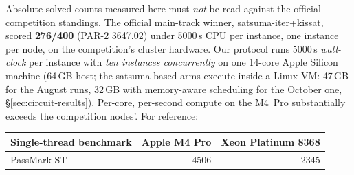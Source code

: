 \documentclass[10pt]{article}
\begin{document}
Absolute solved counts measured here must \emph{not} be read against
the official competition standings. The official main-track winner,
satsuma-iter+kissat, scored \textbf{276/400} (PAR-2 3647.02) under
5000\,s CPU per instance, one instance per node, on the competition's
cluster hardware. Our protocol runs 5000\,s \emph{wall-clock} per
instance with \emph{ten instances concurrently} on one 14-core Apple
Silicon machine (64\,GB host; the satsuma-based arms execute inside a
Linux VM: 47\,GB for the August runs, 32\,GB with memory-aware
scheduling for the October one, \S\ref{sec:circuit-results}). Per-core,
per-second compute on the M4~Pro
substantially exceeds the competition nodes'. For reference:

\begin{center}
\begin{tabular}{@{}lrr@{}}
\toprule
Single-thread benchmark & Apple M4 Pro & Xeon Platinum 8368 \\
\midrule
PassMark ST & 4506 & 2345 \\
\bottomrule
\end{tabular}
\end{center}
\end{document}
